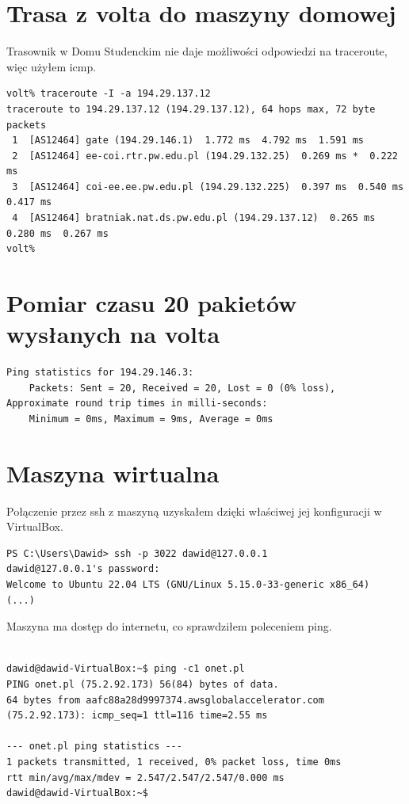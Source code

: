 \documentclass[a4paper,11pt]{article}
\begin{document}
\section{Trasa z volta do maszyny domowej}

Trasownik w Domu Studenckim nie daje możliwości odpowiedzi na traceroute, więc użyłem icmp.

\begin{verbatim}
volt% traceroute -I -a 194.29.137.12
traceroute to 194.29.137.12 (194.29.137.12), 64 hops max, 72 byte packets
 1  [AS12464] gate (194.29.146.1)  1.772 ms  4.792 ms  1.591 ms
 2  [AS12464] ee-coi.rtr.pw.edu.pl (194.29.132.25)  0.269 ms *  0.222 ms
 3  [AS12464] coi-ee.ee.pw.edu.pl (194.29.132.225)  0.397 ms  0.540 ms  0.417 ms
 4  [AS12464] bratniak.nat.ds.pw.edu.pl (194.29.137.12)  0.265 ms  0.280 ms  0.267 ms
volt%
\end{verbatim}

\section{Pomiar czasu 20 pakietów wysłanych na volta}

\begin{verbatim}
Ping statistics for 194.29.146.3:
    Packets: Sent = 20, Received = 20, Lost = 0 (0% loss),
Approximate round trip times in milli-seconds:
    Minimum = 0ms, Maximum = 9ms, Average = 0ms
\end{verbatim}

\section{Maszyna wirtualna}

Połączenie przez ssh z maszyną uzyskałem dzięki właściwej jej konfiguracji w VirtualBox.

\begin{verbatim}
PS C:\Users\Dawid> ssh -p 3022 dawid@127.0.0.1
dawid@127.0.0.1's password:
Welcome to Ubuntu 22.04 LTS (GNU/Linux 5.15.0-33-generic x86_64)
(...)
\end{verbatim}

Maszyna ma dostęp do internetu, co sprawdziłem poleceniem ping.

\begin{verbatim}

dawid@dawid-VirtualBox:~$ ping -c1 onet.pl
PING onet.pl (75.2.92.173) 56(84) bytes of data.
64 bytes from aafc88a28d9997374.awsglobalaccelerator.com (75.2.92.173): icmp_seq=1 ttl=116 time=2.55 ms

--- onet.pl ping statistics ---
1 packets transmitted, 1 received, 0% packet loss, time 0ms
rtt min/avg/max/mdev = 2.547/2.547/2.547/0.000 ms
dawid@dawid-VirtualBox:~$

\end{verbatim}
\end{document}
